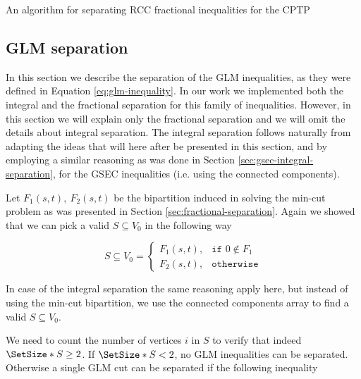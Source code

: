 \begin{algorithm}
	\caption{An algorithm for separating RCC fractional inequalities for the CPTP}
	\label{algo:rcc-frac-sep}
	
\end{algorithm}

\subsection{GLM separation}
\label{sec:impl-glm-separation}

In this section we describe the separation of the GLM inequalities, as they were defined in Equation \eqref{eq:glm-inequality}.
In our work we implemented both the integral and the fractional separation for this family of inequalities.
However, in this section we will explain only the fractional separation and we will omit the details about integral separation.
The integral separation follows naturally from adapting the ideas that will here after be presented in this section, and by employing a similar reasoning as was done in Section \ref{sec:gsec-integral-separation}, for the GSEC inequalities (i.e. using the connected components).

Let $F_1(s, t),\ F_2(s, t)$ be the bipartition induced in solving the min-cut problem as was presented in Section \ref{sec:fractional-separation}.
Again we showed that we can pick a valid $S \subseteq V_0$ in the following way

\begin{equation}
	S \subseteq V_0 =
	\begin{cases}
		F_1(s, t), & \texttt{if } 0 \notin F_1 \\
		F_2(s, t), & \texttt{otherwise}
	\end{cases}
\end{equation}

In case of the integral separation the same reasoning apply here, but instead of using the min-cut bipartition, we use the connected components array to find a valid $S \subseteq V_0$.

We need to count the number of vertices $i$ in $S$ to verify that indeed $\SetSize*{S} \ge 2$.
If $\SetSize*{S} < 2$, no GLM inequalities can be separated.
Otherwise a single GLM cut can be separated if the following inequality

